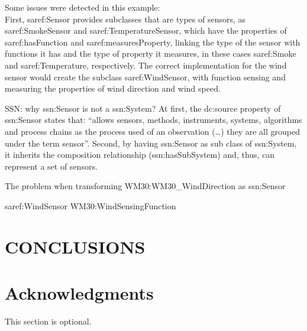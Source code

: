 \documentclass{sig-alternate-05-2015}
\begin{document}
Some issues were detected in this example:
\\First, saref:Sensor provides subclasses that are types of sensors, as saref:SmokeSensor and saref:TemperatureSensor, which have the properties of saref:hasFunction and saref:measuresProperty, linking the type of the sensor with functions it has and the type of property it measures, in these cases saref:Smoke and saref:Temperature, respectively. The correct implementation for the wind sensor would create the subclass saref:WindSensor, with function sensing and measuring the properties of wind direction and wind speed. 


SSN: why ssn:Sensor is not a ssn:System? At first, the dc:source property of ssn:Sensor states that: “allows sensors, methods, instruments, systems, algorithms and process chains as the process used of an observation (…) they are all grouped under the term sensor”. Second, by having ssn:Sensor as sub class of ssn:System, it inherits the composition relationship (ssn:hasSubSystem) and, thus, can represent a set of sensors.  

The problem when transforming WM30:WM30\_WindDirection as ssn:Sensor 

saref:WindSensor
WM30:WindSensingFunction



\section{CONCLUSIONS}

\section{Acknowledgments}
This section is optional.

%

%
%
\end{document}
